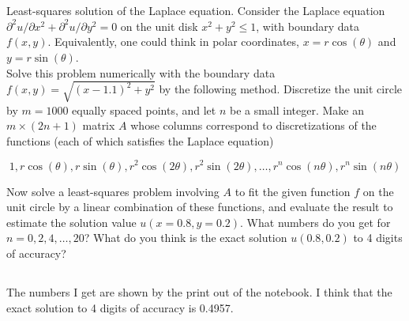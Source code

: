 \documentclass[10pt]{article}
\begin{document}
\section{}
Least-squares solution of the Laplace equation. Consider the Laplace equation $\partial^{2} u / \partial x^{2} + \partial^{2} u / \partial y^{2} = 0$ on the unit disk $x^{2} + y^{2} \leq 1$, with boundary data $f(x, y)$. Equivalently, one could think in polar coordinates, $x = r \cos (\theta)$ and $y = r \sin (\theta)$.\\
Solve this problem numerically with the boundary data $f(x, y) = \sqrt{(x - 1.1)^{2} + y^{2}}$ by the following method. Discretize the unit circle by $m = 1000$ equally spaced points, and let $n$ be a small integer. Make an $m \times (2n + 1)$ matrix $A$ whose columns correspond to discretizations of the functions (each of which satisfies the Laplace equation)

$$
1, r \cos (\theta), r \sin (\theta), r^{2} \cos (2 \theta), r^{2} \sin (2 \theta), \ldots, r^{n} \cos (n \theta), r^{n} \sin (n \theta)
$$

Now solve a least-squares problem involving $A$ to fit the given function $f$ on the unit circle by a linear combination of these functions, and evaluate the result to estimate the solution value $u(x = 0.8, y = 0.2)$. What numbers do you get for $n = 0, 2, 4, \ldots, 20$? What do you think is the exact solution $u(0.8, 0.2)$ to 4 digits of accuracy?
\subsection{}
The numbers I get are shown by the print out of the notebook. I think that the exact solution to 4 digits of accuracy is 0.4957.


\end{document}
